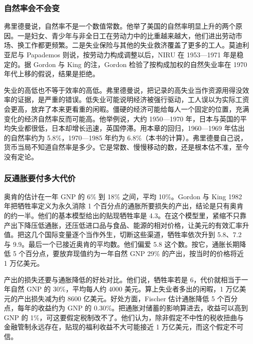 \subsubsection{自然率会不会变}

弗里德曼说，自然率不是一个数值常数\cite{friedman1976}。他举了美国的自然率明显上升的两个原因。一是妇女、青少年与非全日工在劳动力中的比重越来越大，他们进出劳动市场、换工作都更频繁\cite{friedman1976}。二是失业保险与其他的失业救济覆盖了更多的工人\cite{friedman1976}。莫迪利亚尼与 Papademos 则说，按劳动力构成调整以后，NIRU 在 1953—1971 年是稳定的\cite{modigliani1975}。据 Gordon 与 King 的注，Gordon 检验了按构成加权的自然失业率在 1970 年代上移的假说，结果是拒绝\cite{gordon1982}。

失业的高低也不等于效率的高低。弗里德曼说，把记录的高失业当作资源用得没效率的证据，是严重的错误\cite{friedman1976}。低失业可能说明经济被强行驱动，工人误以为实际工资会更高，放弃了本来更看重的闲暇\cite{friedman1976}。僵硬的经济可能给每人一个固定的位置，充满变化的经济自然率反而可能高\cite{friedman1976}。他举例说，大约 1950—1970 年，日本与英国的平均失业都很低，日本却增长迅速，英国停滞\cite{friedman1976}。用本章的回归，1960—1969 年估出的自然率约为 5.8\%，1970—1985 年约为 6.8\%（本书的计算）。弗里德曼自己说，货币当局不知道自然率是多少\cite{friedman1968}。它是常数、慢慢移动的数，还是根本估不准，至今没有定论。

\subsubsection{反通胀要付多大代价}

奥肯的估计在一年 GNP 的 6\% 到 18\% 之间，平均 10\%\cite{gordon1982}。Gordon 与 King 1982 年把牺牲率定义为永久消除 1 个百分点的通胀所要损失的产出，结论是只有奥肯的约一半\cite{gordon1982}。他们的基本模型给出的贴现牺牲率是 4.3\cite{gordon1982}。在这个模型里，紧缩不只靠产出下降压低通胀，还压低进口品与食品、能源的相对价格，让美元的有效汇率升值\cite{gordon1982}。把这几个国际变量逐个当作外生，切断这些渠道，牺牲率依次升到 5.8、7.2 与 9.9\cite{gordon1982}。最后一个已接近奥肯的平均数\cite{gordon1982}。他们偏爱 5.8 这个数\cite{gordon1982}。按它，通胀长期降低 5 个百分点，要放弃现值约为一年自然 GNP 29\% 的产出，按当时的价格将近 1 万亿美元\cite{gordon1982}。

产出的损失还要与通胀降低的好处对比\cite{gordon1982}。他们说，牺牲率若是 6，代价就相当于一年自然 GNP 的 30\%，平均每人约 4000 美元\cite{gordon1982}。算上失业者多出的闲暇，1 万亿美元的产出损失减为约 8600 亿美元\cite{gordon1982}。好处方面，Fischer 估计通胀降低 5 个百分点，每年的收益约为 GNP 的 0.30\%\cite{gordon1982}。把通胀对储蓄的影响算进去，收益可以高到 GNP 的 1\%，可这要假定税制改不了\cite{gordon1982}。他们认为，除非假定不中性的税收扭曲与金融管制永远存在，贴现的福利收益不大可能接近 1 万亿美元，而这个假定不可信\cite{gordon1982}。

